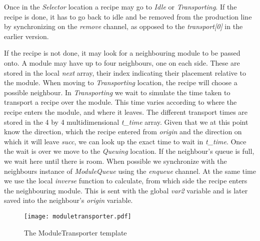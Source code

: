 Once in the \emph{Selector} location a recipe may go to \emph{Idle} or \emph{Transporting}. If the recipe is done, it has to go back to idle and be removed from the production line by synchronizing on the \emph{remove} channel, as opposed to the \emph{transport[0]} in the earlier version.

If the recipe is not done, it may look for a neighbouring module to be passed onto. A module may have up to four neighbours, one on each side. These are stored in the local \emph{next} array, their index indicating their placement relative to the module. When moving to \emph{Transporting} location, the recipe will choose a possible neighbour. In \emph{Transporting} we wait to simulate the time taken to transport a recipe over the module. This time varies according to where the recipe enters the module, and where it leaves. The different transport times are stored in the 4 by 4 multidimensional \emph{t\_time} array. Given that we at this point know the direction, which the recipe entered from \emph{origin} and the direction on which it will leave \emph{succ}, we can look up the exact time to wait in \emph{t\_time}. Once the wait is over we move to the \emph{Queuing} location. If the neighbour's queue is full, we wait here until there is room. When possible we synchronize with the neighbours instance of \emph{ModuleQueue} using the \emph{enqueue} channel. At the same time we use the local \emph{inverse} function to calculate, from which side the recipe enters the neighbouring module. This is sent with the global \emph{var2} variable and is later saved into the neighbour's \emph{origin} variable. 

\begin{figure}[h]
\centering
\texttt{[image: moduletransporter.pdf]}
\caption{The ModuleTransporter template}
\label{fig:moduletransporter}
\end{figure}




